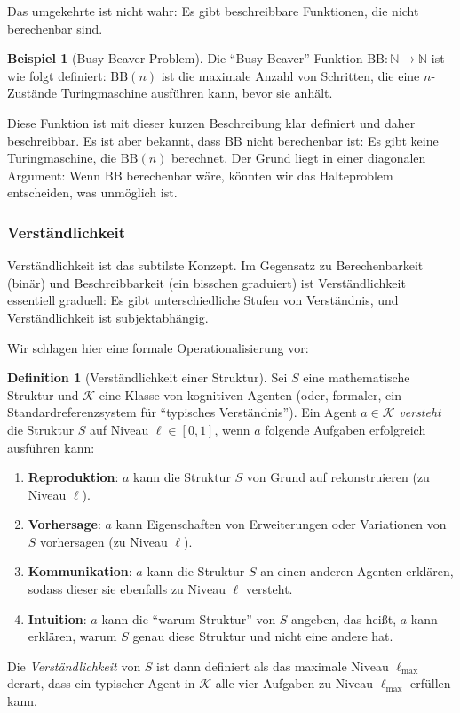 \documentclass[a4paper,12pt]{article}
\theoremstyle{definition}
\newtheorem{definition}{Definition}
\newtheorem{beispiel}{Beispiel}
\begin{document}
Das umgekehrte ist nicht wahr: Es gibt beschreibbare Funktionen, die nicht berechenbar sind.

\begin{beispiel}[Busy Beaver Problem]
Die ``Busy Beaver'' Funktion $\text{BB}: \mathbb{N} \to \mathbb{N}$ ist wie folgt definiert: $\text{BB}(n)$ ist die maximale Anzahl von Schritten, die eine $n$-Zustände Turingmaschine ausführen kann, bevor sie anhält.

Diese Funktion ist mit dieser kurzen Beschreibung klar definiert und daher beschreibbar. Es ist aber bekannt, dass $\text{BB}$ nicht berechenbar ist: Es gibt keine Turingmaschine, die $\text{BB}(n)$ berechnet. Der Grund liegt in einer diagonalen Argument: Wenn $\text{BB}$ berechenbar wäre, könnten wir das Halteproblem entscheiden, was unmöglich ist.
\end{beispiel}

\subsubsection{Verständlichkeit}

Verständlichkeit ist das subtilste Konzept. Im Gegensatz zu Berechenbarkeit (binär) und Beschreibbarkeit (ein bisschen graduiert) ist Verständlichkeit essentiell graduell: Es gibt unterschiedliche Stufen von Verständnis, und Verständlichkeit ist subjektabhängig.

Wir schlagen hier eine formale Operationalisierung vor:

\begin{definition}[Verständlichkeit einer Struktur]
Sei $S$ eine mathematische Struktur und $\mathcal{K}$ eine Klasse von kognitiven Agenten (oder, formaler, ein Standardreferenzsystem für ``typisches Verständnis''). Ein Agent $a \in \mathcal{K}$ \textit{versteht} die Struktur $S$ auf Niveau $\ell \in [0,1]$, wenn $a$ folgende Aufgaben erfolgreich ausführen kann:

\begin{enumerate}
\item \textbf{Reproduktion}: $a$ kann die Struktur $S$ von Grund auf rekonstruieren (zu Niveau $\ell$).
\item \textbf{Vorhersage}: $a$ kann Eigenschaften von Erweiterungen oder Variationen von $S$ vorhersagen (zu Niveau $\ell$).
\item \textbf{Kommunikation}: $a$ kann die Struktur $S$ an einen anderen Agenten erklären, sodass dieser sie ebenfalls zu Niveau $\ell$ versteht.
\item \textbf{Intuition}: $a$ kann die ``warum-Struktur'' von $S$ angeben, das heißt, $a$ kann erklären, warum $S$ genau diese Struktur und nicht eine andere hat.
\end{enumerate}

Die \textit{Verständlichkeit} von $S$ ist dann definiert als das maximale Niveau $\ell_{\max}$ derart, dass ein typischer Agent in $\mathcal{K}$ alle vier Aufgaben zu Niveau $\ell_{\max}$ erfüllen kann.
\end{definition}
\end{document}
